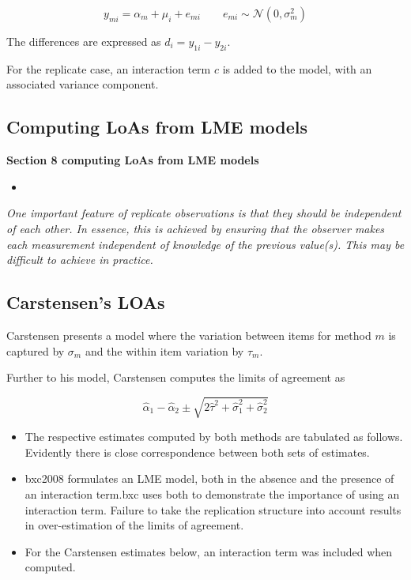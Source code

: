 %

\begin{equation}
y_{mi}  = \alpha_{m} + \mu_{i} + e_{mi} \qquad  e_{mi} \sim \mathcal{N}(0,\sigma^{2}_{m})
\end{equation}

The differences are expressed as $d_{i} = y_{1i} - y_{2i}$.

For the replicate case, an interaction term $c$ is added to the model, with an associated variance component.

\subsection{Computing LoAs from LME models}

%
\textbf{Section 8 computing LoAs from LME models}

\begin{itemize}
\item
\end{itemize}


%
\emph{
One important feature of replicate observations is that they should be independent
of each other. In essence, this is achieved by ensuring that the observer makes each
measurement independent of knowledge of the previous value(s). This may be difficult
to achieve in practice.}


\subsection{Carstensen's LOAs}
%
Carstensen presents a model where the variation between items for
method $m$ is captured by $\sigma_m$ and the within item variation
by $\tau_m$.

Further to his model, Carstensen computes the limits of agreement
as

\[
\hat{\alpha}_1 - \hat{\alpha}_2 \pm \sqrt{2 \hat{\tau}^2 +
\hat{\sigma}^2_1 + \hat{\sigma}^2_2}
\]

%
\large
\begin{itemize}
\item The respective estimates computed by both methods are tabulated as follows. Evidently there is close correspondence between both sets of estimates.

\item \alert{bxc2008} formulates an LME model, both in the absence and the presence of an interaction term.\alert{bxc} uses both to demonstrate the importance of using an interaction term. Failure to take the replication structure into
account results in over-estimation of the limits of agreement. 
\item For the Carstensen estimates below, an interaction term was included when computed.
\end{itemize}



